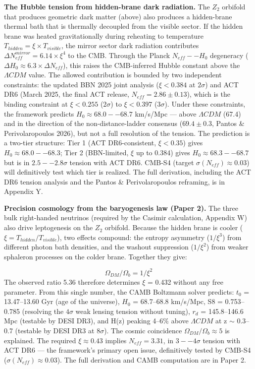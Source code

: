 \documentclass[aps,prd,preprint,superscriptaddress,longbibliography,floatfix]{revtex4-2}
\theoremstyle{remark}
\begin{document}
\textbf{The Hubble tension from hidden-brane dark radiation.} The $Z_{2}$ orbifold that produces geometric dark matter (above) also produces a hidden-brane thermal bath that is thermally decoupled from the visible sector. If the hidden brane was heated gravitationally during reheating to temperature $T_{hidden} = \xi \times T_{visible}$, the mirror sector dark radiation contributes $\Delta N_{eff}^{mirror} = 6.14 \times \xi^{4}$ to the CMB. Through the Planck $N_{eff}--H_{0}$ degeneracy ($\Delta H_{0} \approx 6.3 \times \Delta N_{eff}$), this raises the CMB-inferred Hubble constant above the $\Lambda CDM$ value. The allowed contribution is bounded by two independent constraints: the updated BBN 2025 joint analysis ($\xi < 0.384$ at $2\sigma$) and ACT DR6 (March 2025, the final ACT release, $N_{eff} = 2.86 \pm 0.13$), which is the binding constraint at $\xi < 0.255$ ($2\sigma$) to $\xi < 0.397$ ($3\sigma$). Under these constraints, the framework predicts $H_{0} \approx 68.0--68.7$ km/s/Mpc --- above $\Lambda CDM$ (67.4) and in the direction of the non-distance-ladder consensus ($69.4 \pm 0.3$, Pantos \& Perivolaropoulos 2026), but not a full resolution of the tension. The prediction is a two-tier structure: Tier 1 (ACT DR6-consistent, $\xi < 0.35$) gives $H_{0} \approx 68.0--68.3$; Tier 2 (BBN-limited, $\xi$ up to 0.384) gives $H_{0} \approx 68.3--68.7$ but is in $2.5--2.8\sigma$ tension with ACT DR6. CMB-S4 (target $\sigma(N_{eff}) \approx 0.03$) will definitively test which tier is realized. The full derivation, including the ACT DR6 tension analysis and the Pantos \& Perivolaropoulos reframing, is in Appendix Y.

\textbf{Precision cosmology from the baryogenesis law (Paper 2).} The three bulk right-handed neutrinos (required by the Casimir calculation, Appendix W) also drive leptogenesis on the $Z_{2}$ orbifold. Because the hidden brane is cooler ($\xi = T_{hidden}/T_{visible}$), two effects compound: the entropy asymmetry ($1/\xi^{3}$) from different photon bath densities, and the washout suppression ($1/\xi^{2}$) from weaker sphaleron processes on the colder brane. Together they give:


\begin{equation}
    \Omega_{DM} / \Omega_b = 1/\xi^{2}
\end{equation}
The observed ratio 5.36 therefore determines $\xi$ = 0.432 without any free parameter. From this single number, the CAMB Boltzmann solver predicts: $t_{0}$ = 13.47--13.60 Gyr (age of the universe), $H_{0}$ = 68.7--68.8 km/s/Mpc, S8 = 0.753--0.785 (resolving the $4\sigma$ weak lensing tension without tuning), $r_d$ = 145.8--146.6 Mpc (testable by DESI DR3), and H(z) peaking 4--6\% above $\Lambda CDM$ at z $\sim$ 0.3--0.7 (testable by DESI DR3 at $8\sigma$). The cosmic coincidence $\Omega_{DM}/\Omega_b \approx 5$ is explained. The required $\xi \approx 0.43$ implies $N_{eff} = 3.31$, in $3--4\sigma$ tension with ACT DR6 --- the framework's primary open issue, definitively tested by CMB-S4 ($\sigma(N_{eff}) \approx 0.03$). The full derivation and CAMB computation are in Paper 2.
\end{document}
